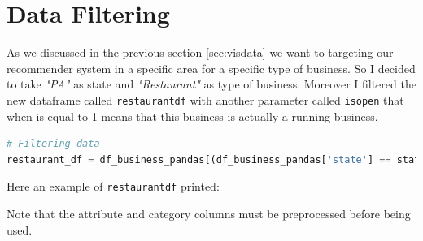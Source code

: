 \documentclass[12pt,english]{report}
\begin{document}
\section{Data Filtering}
As we discussed in the previous section \ref{sec:visdata} we want to targeting our recommender system in a specific area for a specific type of business. So I decided to take \textit{"PA"} as state and \textit{"Restaurant"} as type of business. Moreover I filtered the new dataframe called \texttt{restaurant\textunderscore df} with another parameter called \texttt{is\textunderscore open} that when is equal to 1 means that this business is actually a running business.
\begin{lstlisting}[language={Python},label={lst:filtdata},caption={Filtering Pyspark df}]
# Filtering data
restaurant_df = df_business_pandas[(df_business_pandas['state'] == state) & (df_business_pandas['is_open'] == 1) & df_business_pandas['categories'].str.contains(type_business)==True].reset_index()
\end{lstlisting}
Here an example of \texttt{restaurant\textunderscore df} printed:
\begin{table}[h]
\centering
\small
{}
\caption{Example of a restaurant\_df's row}
\label{tab:rowrest}
\end{table}
Note that the attribute and category columns must be preprocessed before being used.
\end{document}
